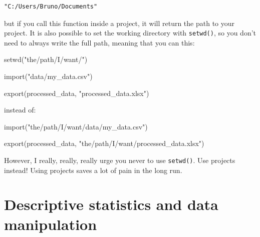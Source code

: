 \documentclass[
]{article}
\newenvironment{Shaded}{\begin{snugshade}}{\end{snugshade}}
\newcommand{\FunctionTok}[1]{\textcolor[rgb]{0.00,0.00,0.00}{#1}}
\newcommand{\NormalTok}[1]{#1}
\newcommand{\StringTok}[1]{\textcolor[rgb]{0.31,0.60,0.02}{#1}}
\begin{document}
\begin{verbatim}
"C:/Users/Bruno/Documents"
\end{verbatim}

but if you call this function inside a project, it will return the path to your project. It is also
possible to set the working directory with \texttt{setwd()}, so you don't need to always write the full
path, meaning that you can this:

\begin{Shaded}
\begin{Highlighting}[]
\FunctionTok{setwd}\NormalTok{(}\StringTok{"the/path/I/want/"}\NormalTok{)}

\FunctionTok{import}\NormalTok{(}\StringTok{"data/my\_data.csv"}\NormalTok{)}

\FunctionTok{export}\NormalTok{(processed\_data, }\StringTok{"processed\_data.xlsx"}\NormalTok{)}
\end{Highlighting}
\end{Shaded}

instead of:

\begin{Shaded}
\begin{Highlighting}[]
\FunctionTok{import}\NormalTok{(}\StringTok{"the/path/I/want/data/my\_data.csv"}\NormalTok{)}

\FunctionTok{export}\NormalTok{(processed\_data, }\StringTok{"the/path/I/want/processed\_data.xlsx"}\NormalTok{)}
\end{Highlighting}
\end{Shaded}

However, I really, really, really urge you never to use \texttt{setwd()}. Use projects instead!
Using projects saves a lot of pain in the long run.

\hypertarget{descriptive-statistics-and-data-manipulation}{%
\section{Descriptive statistics and data manipulation}\label{descriptive-statistics-and-data-manipulation}}
\end{document}
